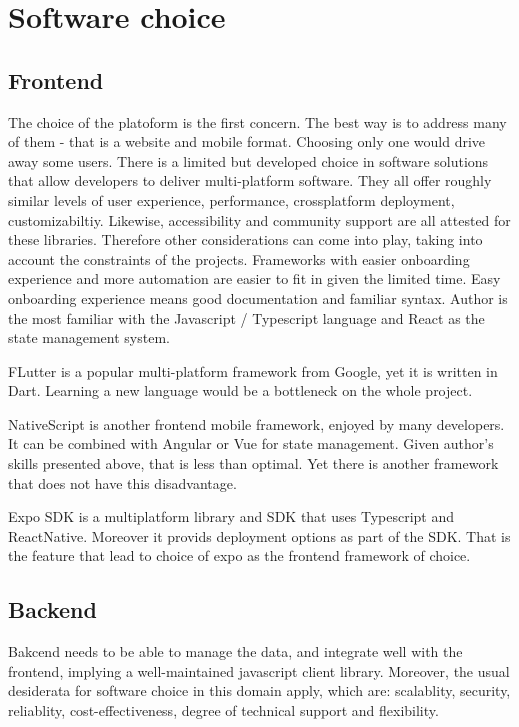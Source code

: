 \documentclass{report}
\begin{document}
\section{Software choice}

\subsection{Frontend}
The choice of the platoform is the first concern. The best way is to address many of them - that is a website and mobile format. Choosing only one would drive away some users. 
There is a limited but developed choice in software solutions that allow developers to deliver multi-platform software. They all offer roughly similar levels of user experience, performance, crossplatform deployment, customizabiltiy. Likewise, accessibility and community support are all attested for these libraries.
Therefore other considerations can come into play, taking into account the constraints of the projects. Frameworks with easier onboarding experience and more automation are easier to fit in given the limited time. Easy onboarding experience means good documentation and familiar syntax.
Author is the most familiar with the Javascript / Typescript language and React as the state management system.

FLutter is a popular multi-platform framework from Google, yet it is written in Dart. Learning a new language would be a bottleneck on the whole project.
\cite{noauthor_flutter_nodate}

NativeScript is another frontend mobile framework, enjoyed by many developers. It can be combined with Angular or Vue for state management.
\cite{noauthor_nativescript_nodate}
Given author's skills presented above, that is less than optimal. Yet there is another framework that does not have this disadvantage.

Expo SDK is a multiplatform library and SDK that uses Typescript and ReactNative.
Moreover it provids deployment options as part of the SDK. That is the feature that lead to choice of expo as the frontend framework of choice. 

\subsection{Backend}

Bakcend needs to be able to manage the data, and integrate well with the frontend, implying a well-maintained javascript client library.
Moreover, the usual desiderata for software choice in this domain apply, which are: scalablity, security, reliablity, cost-effectiveness, degree of technical support and flexibility. 
\end{document}
